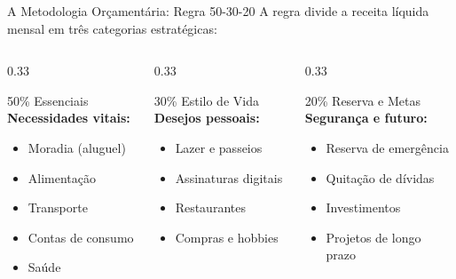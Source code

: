 \documentclass[10pt]{beamer}
\begin{document}
\begin{frame}{A Metodologia Orçamentária: Regra 50-30-20}
    A regra divide a receita líquida mensal em três categorias estratégicas:

    \vspace{0.3cm}
    \begin{columns}
        \begin{column}{0.33\textwidth}
            \begin{exampleblock}{50\% Essenciais}
                \textbf{Necessidades vitais:}
                \begin{itemize}
                    \item Moradia (aluguel)
                    \item Alimentação
                    \item Transporte
                    \item Contas de consumo
                    \item Saúde
                \end{itemize}
            \end{exampleblock}
        \end{column}

        \begin{column}{0.33\textwidth}
            \begin{alertblock}{30\% Estilo de Vida}
                \textbf{Desejos pessoais:}
                \begin{itemize}
                    \item Lazer e passeios
                    \item Assinaturas digitais
                    \item Restaurantes
                    \item Compras e hobbies
                \end{itemize}
            \end{alertblock}
        \end{column}

        \begin{column}{0.33\textwidth}
            \begin{block}{20\% Reserva e Metas}
                \textbf{Segurança e futuro:}
                \begin{itemize}
                    \item Reserva de emergência
                    \item Quitação de dívidas
                    \item Investimentos
                    \item Projetos de longo prazo
                \end{itemize}
            \end{block}
        \end{column}
    \end{columns}
\end{frame}
\end{document}

